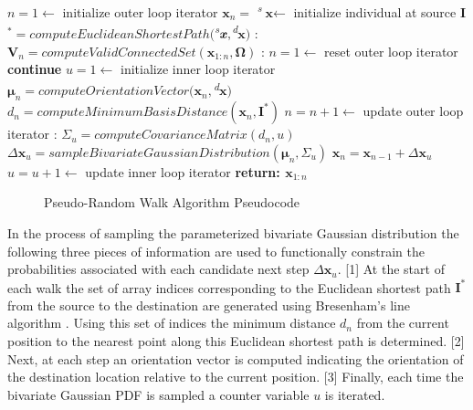                 \begin{algorithm}
                \caption{}\label{euclid}
                \begin{algorithmic}[1]
                \State $n = 1 \gets$ initialize outer loop iterator
                \State $\textbf{x}_n =$ \textsuperscript{\textit{s}}$\textbf{x} \gets$ initialize individual at source
                \State \textbf{I}$^{*} = computeEuclideanShortestPath($\textsuperscript{\textit{s}}$\textbf{\textit{x}},$\textsuperscript{\textit{d}}$\textbf{x})$
                :
                \State $\textbf{V}_n = computeValidConnectedSet(\textbf{x}_{1:n},\boldsymbol\Omega)$
                :
                \State $n = 1 \gets$ reset outer loop iterator
                \State \textbf{continue}
                \EndIf
                \State $u = 1 \gets$ initialize inner loop iterator
                \State $\boldsymbol{\mu}_n = computeOrientationVector(\textbf{x}_n,$\textsuperscript{\textit{d}}$\textbf{x})$
                \State $d_n = computeMinimumBasisDistance(\textbf{x}_{n},\textbf{I}^{*})$
                \State $n = n + 1 \gets$ update outer loop iterator
                :
                \State $\Sigma_u = computeCovarianceMatrix(d_n,u)$
                \State $\Delta\textbf{x}_u = sampleBivariateGaussianDistribution(\boldsymbol\mu_n,\Sigma_u)$
                \State $\textbf{x}_{n} = \textbf{x}_{n-1} + \Delta\textbf{x}_{u}$
                \State $u = u + 1 \gets$ update inner loop iterator
                \EndWhile {}
                \EndWhile {}
                \State \textbf{return: $\textbf{x}_{1:n}$}
                \EndProcedure
                \end{algorithmic}
                \end{algorithm}
                
            \begin{figure}[!h]
            \caption[Pseudo-Random Walk Algorithm Pseudocode]{Pseudo-Random Walk Algorithm Pseudocode}
            \label{fig:pseudo-random-walk-pseudocode}
            \end{figure}
            
In the process of sampling the parameterized bivariate Gaussian distribution the following three pieces of information are used to functionally constrain the probabilities associated with each candidate next step $\Delta\textbf{x}_u$. [1] At the start of each walk the set of array indices corresponding to the Euclidean shortest path $\textbf{I}^*$ from the source to the destination are generated using Bresenham's line algorithm \cite{Bresenham1977}. Using this set of indices the minimum distance $d_n$ from the current position to the nearest point along this Euclidean shortest path is determined. [2] Next, at each step an orientation vector is computed indicating the orientation of the destination location relative to the current position. [3] Finally, each time the bivariate Gaussian PDF is sampled a counter variable $u$ is iterated. 

